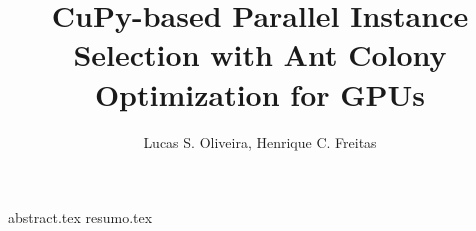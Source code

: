 \documentclass[12pt]{article}
\title{CuPy-based Parallel Instance Selection with Ant Colony Optimization for GPUs}
\author{{Lucas S. Oliveira\inst{1}, Henrique C. Freitas\inst{1}}}
\begin{document}
 

\maketitle

{abstract.tex}
{resumo.tex}
\end{document}

